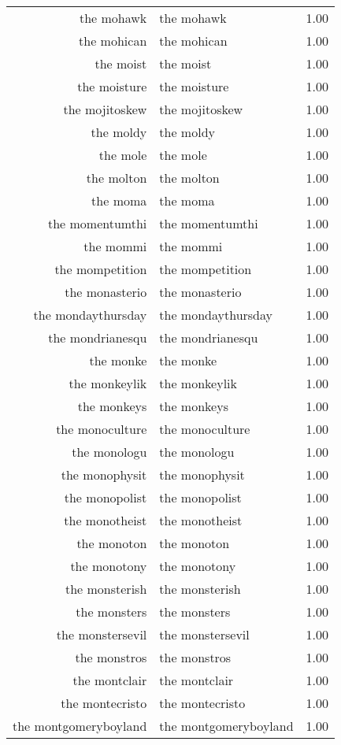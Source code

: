 \begin{table}[ht]
\begin{tabular}{rlr}
  the mohawk & the mohawk & 1.00 \\ 
  the mohican & the mohican & 1.00 \\ 
  the moist & the moist & 1.00 \\ 
  the moisture & the moisture & 1.00 \\ 
  the mojitoskew & the mojitoskew & 1.00 \\ 
  the moldy & the moldy & 1.00 \\ 
  the mole & the mole & 1.00 \\ 
  the molton & the molton & 1.00 \\ 
  the moma & the moma & 1.00 \\ 
  the momentumthi & the momentumthi & 1.00 \\ 
  the mommi & the mommi & 1.00 \\ 
  the mompetition & the mompetition & 1.00 \\ 
  the monasterio & the monasterio & 1.00 \\ 
  the mondaythursday & the mondaythursday & 1.00 \\ 
  the mondrianesqu & the mondrianesqu & 1.00 \\ 
  the monke & the monke & 1.00 \\ 
  the monkeylik & the monkeylik & 1.00 \\ 
  the monkeys & the monkeys & 1.00 \\ 
  the monoculture & the monoculture & 1.00 \\ 
  the monologu & the monologu & 1.00 \\ 
  the monophysit & the monophysit & 1.00 \\ 
  the monopolist & the monopolist & 1.00 \\ 
  the monotheist & the monotheist & 1.00 \\ 
  the monoton & the monoton & 1.00 \\ 
  the monotony & the monotony & 1.00 \\ 
  the monsterish & the monsterish & 1.00 \\ 
  the monsters & the monsters & 1.00 \\ 
  the monstersevil & the monstersevil & 1.00 \\ 
  the monstros & the monstros & 1.00 \\ 
  the montclair & the montclair & 1.00 \\ 
  the montecristo & the montecristo & 1.00 \\ 
  the montgomeryboyland & the montgomeryboyland & 1.00 \\ 

\end{tabular}
\end{table}
